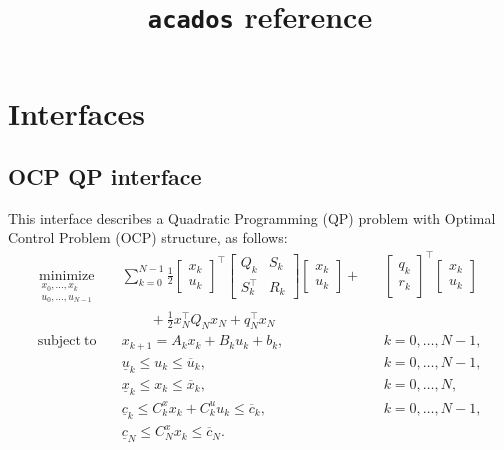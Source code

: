 \documentclass{report}
\title{\texttt{acados} reference}
\begin{document}
\maketitle

\chapter{Interfaces}

\section{OCP QP interface}

This interface describes a Quadratic Programming (QP) problem with Optimal Control Problem (OCP) structure, as follows:
\begin{subequations}
	\begin{alignat}{3}
	\underset{\substack{x_0,\ldots,x_k \\ u_0,\ldots,u_{N-1}}}{\mathrm{minimize}} \quad & \sum_{k=0}^{N-1} \frac 1 2 \begin{bmatrix} x_k \\ u_k \end{bmatrix}^\top \begin{bmatrix} Q_k & S_k \\ S_k^\top & R_k \end{bmatrix} \begin{bmatrix} x_k \\ u_k \end{bmatrix} + &&\begin{bmatrix} q_k \\ r_k \end{bmatrix}^\top \begin{bmatrix} x_k \\ u_k \end{bmatrix} \\ & \qquad + \frac 1 2 x_N^\top Q_N x_N + q_N^\top x_N \nonumber \\
	\mathrm{subject~to} \quad & x_{k+1} = A_k x_k + B_k u_k + b_k, && k=0,\dots,N-1, \\
	& \underline u_k \leq u_k \leq \overline u_k, && k=0,\dots,N-1, \\
	& \underline x_k \leq x_k \leq \overline x_k, && k=0,\dots,N, \\
	& \underline c_k \leq C^x_k x_k + C^u_k u_k \leq \overline c_k, && k=0,\dots,N-1, \\
	& \underline c_N \leq C^x_N x_k \leq \overline c_N.
	\end{alignat}
\end{subequations}
\end{document}
